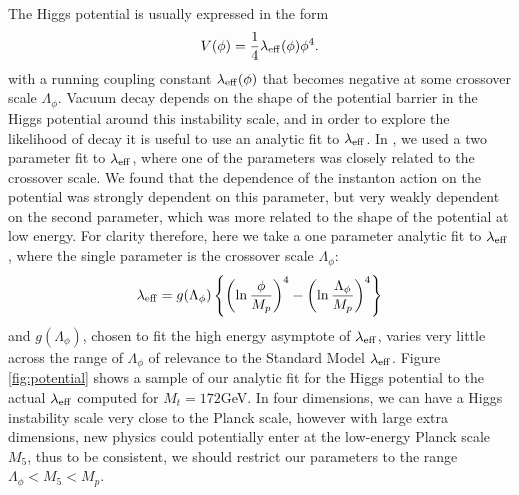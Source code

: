 \documentclass[aps,12pt,prd,superscriptaddress,preprintnumbers, 
	amssymb,
	amsmath,
	notitlepage,
	longbibliography,
	nofootinbib]{revtex4-1}
\newcommand{\be}{\begin{equation}}
\begin{document}
The Higgs potential is usually expressed in the form 
\begin{equation}
V(\phi)=\frac14\lambda_{\rm eff}(\phi)\phi^4.
\end{equation}
with a running coupling constant $\lambda_{\rm eff}(\phi)$ that
becomes negative at some crossover scale $\Lambda_\phi$.
Vacuum decay depends on the shape of the potential barrier
in the Higgs potential around this instability scale, and in order 
to explore the likelihood of decay it is useful to use an analytic
fit to $\lambda_{\rm eff}$. In \cite{BGM3}, we used a two
parameter fit to $\lambda_{\rm eff}$, where one of the parameters
was closely related to the crossover scale. We found that the dependence
of the instanton action on the potential was strongly dependent on 
this parameter, but very weakly dependent on the second parameter,
which was more related to the shape of the potential at low energy. 
For clarity therefore, here we take a one parameter analytic fit to
$\lambda_{\rm eff}$, where the single parameter is the crossover scale
$\Lambda_\phi$:
\be
\lambda_{\rm eff}=g(\Lambda_\phi) \left\{\left(\ln \frac{\phi}{M_p}\right)^4
-\left(\ln \frac{\Lambda_\phi}{M_p}\right)^4\right\}
\label{lambdaeff}
\end{equation}
and $g(\Lambda_\phi)$, chosen to fit the high energy asymptote of 
$\lambda_{\rm eff}$, varies very little across the range of $\Lambda_\phi$
of relevance to the Standard Model $\lambda_{\rm eff}$. Figure
\ref{fig:potential} shows a sample of our analytic fit for the Higgs
potential to the actual $\lambda_{\rm eff}$ computed for $M_t = 172$GeV.
In four dimensions, we can have a Higgs instability scale very close to
the Planck scale, however with large extra dimensions, new physics 
could potentially enter at the low-energy Planck scale $M_5$, thus to be
consistent, we should restrict our parameters to the range $\Lambda_\phi<M_5<M_p$.
\end{document}
